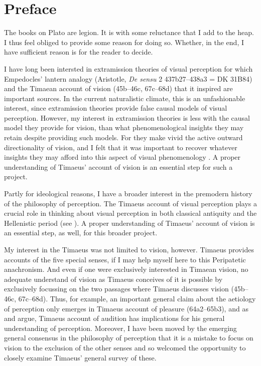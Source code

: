 \chapter*{Preface} %
\label{cha:preface}

The books on Plato are legion. It is with some reluctance that I add to the heap. I thus feel obliged to provide some reason for doing so. Whether, in the end, I have sufficient reason is for the reader to decide.

I have long been intersted in extramission theories of visual perception for which Empedocles' lantern analogy (Aristotle, \emph{De sensu} 2 437b27–438a3 = DK 31B84) and the Timaean account of vision (45b–46c, 67c–68d) that it inspired are important sources. In the current naturalistic climate, this is an unfashionable interest, since extramission theories provide false causal models of visual perception. However, my interest in extramission theories is less with the causal model they provide for vision, than what phenomenological insights they may retain despite providing such models. For they make vivid the active outward directionality of vision, and I felt that it was important to recover whatever insights they may afford into this aspect of visual phenomenology \cite[chapter 5]{Kalderon:2018oe}. A proper understanding of Timaeus' account of vision is an essential step for such a project.

Partly for ideological reasons, I have a broader interest in the premodern history of the philosophy of perception. The Timaeus account of visual perception plays a crucial role in thinking about visual perception in both classical antiquity and the Hellenistic period (see \citealt[chapter 1]{Lindberg:1977aa}). A proper understanding of Timaeus' account of vision is an essential step, as well, for this broader project.

My interest in the Timaeus was not limited to vision, however. Timaeus provides accounts of the five special senses, if I may help myself here to this Peripatetic anachronism. And even if one were exclusively interested in Timaean vision, no adequate understand of vision as Timaeus conceives of it is possible by exclusively focussing on the two passages where Timaeus discusses vision (45b–46c, 67c–68d). Thus, for example, an important general claim about the aetiology of perception only emerges in Timaeus account of pleasure (64a2–65b3), and as \citet{Barker:2000dy} and \citet{Lautner:2005aa} argue, Timaeus account of audition has implications for his general understanding of perception. Moreover, I have been moved by the emerging general consensus in the philosophy of perception that it is a mistake to focus on vision to the exclusion of the other senses and so welcomed the opportunity to closely examine Timaeus' general survey of these.

